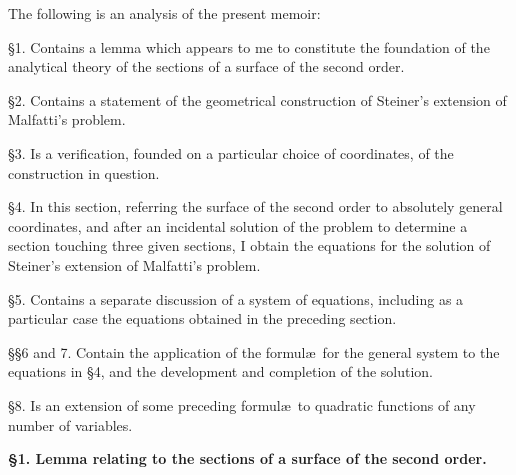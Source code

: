 \documentclass[11pt]{article}
\begin{document}
The following is an analysis of the present memoir:

\S 1. Contains a lemma which appears to me to constitute the foundation of the analytical theory of the sections of a surface of the second order.

\S 2. Contains a statement of the geometrical construction of Steiner's extension of Malfatti's problem.

\S 3. Is a verification, founded on a particular choice of coordinates, of the construction in question.

\S 4. In this section, referring the surface of the second order to absolutely general coordinates, and after an incidental solution of the problem to determine a section touching three given sections, I obtain the equations for the solution of Steiner's extension of Malfatti's problem.

\S 5. Contains a separate discussion of a system of equations, including as a particular case the equations obtained in the preceding section.

\S\S 6 and 7. Contain the application of the formul\ae\ for the general system to the equations in \S 4, and the development and completion of the solution.

\S 8. Is an extension of some preceding formul\ae\ to quadratic functions of any number of variables.

\vspace{0.5em}
\noindent\textbf{\S 1. Lemma relating to the sections of a surface of the second order.}
\end{document}
